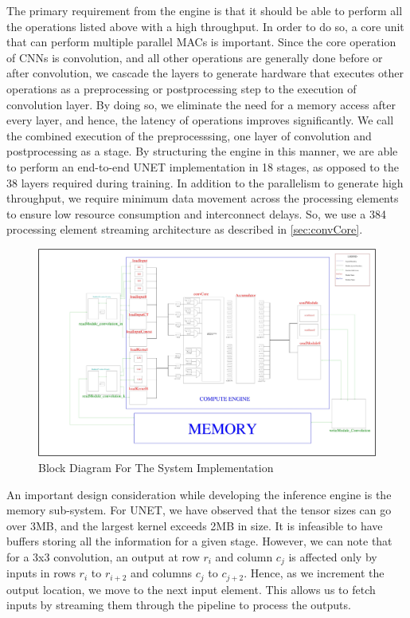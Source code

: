 \documentclass[a4paper,12pt, final]{report}
\begin{document}
The primary requirement from the engine is that it should be able to perform all the operations listed above with a high throughput. In order to do so, a core unit that can perform multiple parallel MACs is important. Since the core operation of CNNs is convolution, and all other operations are generally done before or after convolution, we cascade the layers to generate hardware that executes other operations as a preprocessing or postprocessing step to the execution of convolution layer. By doing so, we eliminate the need for a memory access after every layer, and hence, the latency of operations improves significantly. We call the combined execution of the preprocesssing, one layer of convolution and postprocessing as a stage. By structuring the engine in this manner, we are able to perform an end-to-end UNET implementation in 18 stages, as opposed to the 38 layers required during training. In addition to the parallelism to generate high throughput, we require minimum data movement across the processing elements to ensure low resource consumption and interconnect delays. So, we use a 384 processing element streaming architecture as described in \ref{sec:convCore}.
\\


\begin{figure}[h!]
    \centering
    \includegraphics[width=\textwidth]{block_dia.jpg}
    \caption{Block Diagram For The System Implementation}
    \label{fig:block_dia}
\end{figure}

An important design consideration while developing the inference engine is the memory sub-system. For UNET, we have observed that the tensor sizes can go over 3MB, and the largest kernel exceeds 2MB in size. It is infeasible to have buffers storing all the information for a given stage. However, we can note that for a 3x3 convolution, an output at row $r_i$ and column $c_j$ is affected only by inputs in rows $r_{i}$ to $r_{i+2}$ and columns $c_{j}$ to $c_{j+2}$. Hence, as we increment the output location, we move to the next input element. This allows us to fetch inputs by streaming them through the pipeline to process the outputs.
\\
\end{document}
